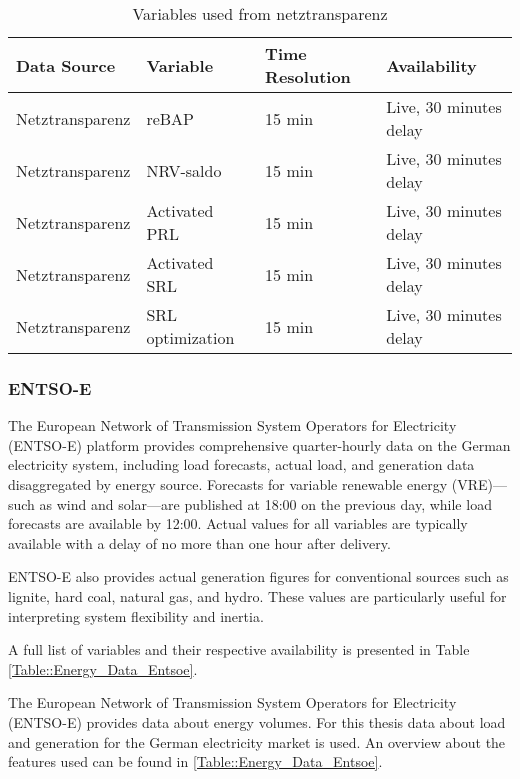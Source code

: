 \documentclass[class=scrbook, crop=false]{standalone}
\begin{document}
\begin{table}[]
\centering
\begin{tabular}{l|l|l|l}
 Data Source & Variable &  Time Resolution & Availability  \\\hline
 Netztransparenz & reBAP & 15 min & Live, 30 minutes delay \\
 Netztransparenz & NRV-saldo & 15 min & Live, 30 minutes delay \\
 Netztransparenz & Activated PRL & 15 min &Live, 30 minutes delay \\
 Netztransparenz & Activated SRL & 15 min & Live, 30 minutes delay \\
 Netztransparenz & SRL optimization & 15 min & Live, 30 minutes delay \\

\end{tabular}
\caption{Variables used from netztransparenz}
\label{Table::Energy_Data_Netztransparenz}
\end{table}

\subsubsection{ENTSO-E}

The European Network of Transmission System Operators for Electricity (ENTSO-E) platform provides comprehensive quarter-hourly data on the German electricity system, including load forecasts, actual load, and generation data disaggregated by energy source. Forecasts for variable renewable energy (VRE)—such as wind and solar—are published at 18:00 on the previous day, while load forecasts are available by 12:00. Actual values for all variables are typically available with a delay of no more than one hour after delivery.

ENTSO-E also provides actual generation figures for conventional sources such as lignite, hard coal, natural gas, and hydro. These values are particularly useful for interpreting system flexibility and inertia.

A full list of variables and their respective availability is presented in Table \ref{Table::Energy_Data_Entsoe}.




The European Network of Transmission System Operators for Electricity (ENTSO-E) provides data about energy volumes.
For this thesis data about load and generation for the German electricity market is used. 
An overview about the features used can be found in \ref{Table::Energy_Data_Entsoe}.
\end{document}
